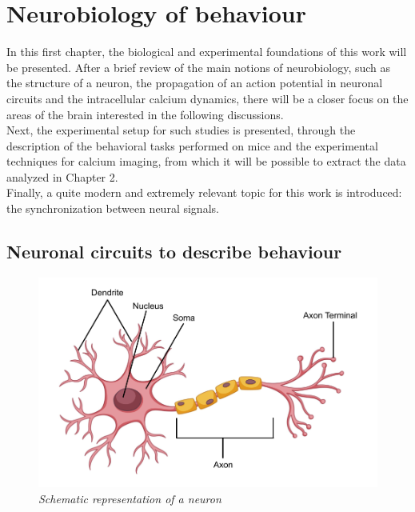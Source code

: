 \documentclass[a4paper]{article}
\begin{document}
	\clearpage
	
	\tableofcontents
	
	
	
	\clearpage
	
	\section{Neurobiology of behaviour}
	
	
	In this first chapter, the biological and experimental foundations of this work will be presented. After a brief review of the main notions of neurobiology, such as the structure of a neuron, the propagation of an action potential in neuronal circuits and the intracellular calcium dynamics, there will be a closer focus on the areas of the brain interested in the following discussions.\\
	Next, the experimental setup for such studies is presented, through the description of the behavioral tasks performed on mice and the experimental techniques for calcium imaging, from which it will be possible to extract the data analyzed in Chapter 2.\\
	Finally, a  quite modern and extremely relevant topic for this work is introduced: the synchronization between neural signals.
	
	\subsection{Neuronal circuits to describe behaviour}
	
	\begin{figure}[H]
		\begin{center}
			\includegraphics[scale=.25]{neuron.png} 
		\end{center} 
		\caption{\textit{Schematic representation of a neuron}}
		
	\end{figure}
	
\end{document}
